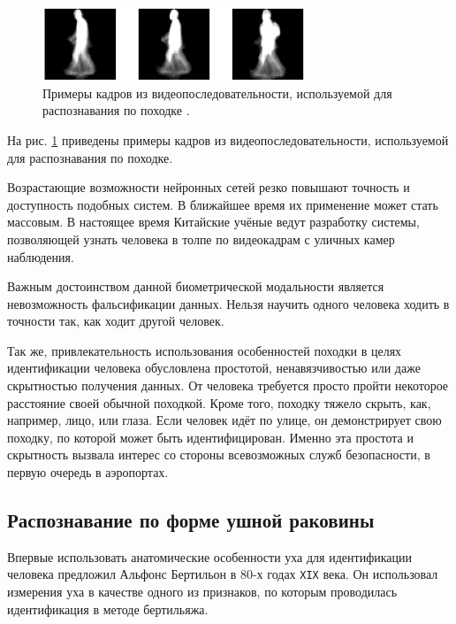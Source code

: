 \documentclass[14pt, a4paper]{extarticle}
\begin{document}
\begin{center}
	\begin{figure}[h!]
		\centering
		\includegraphics[width=0.7\textwidth]{gate.PNG}
		\caption{Примеры кадров из видеопоследовательности, используемой для распознавания по походке \cite{veres2005fusion}.}
		\label{img:gate}
	\end{figure}
\end{center}
\vspace{-1cm}

На рис. \ref{img:gate} приведены примеры кадров из видеопоследовательности, используемой для распознавания по походке. 

Возрастающие возможности нейронных сетей резко повышают точность и доступность подобных систем. В ближайшее время их применение может стать массовым.
В настоящее время Китайские учёные ведут разработку системы, позволяющей узнать человека в толпе по видеокадрам с уличных камер наблюдения. 

Важным достоинством данной биометрической модальности является невозможность фальсификации данных. Нельзя научить одного человека ходить в точности так, как ходит другой человек.

Так же, привлекательность использования особенностей походки в целях идентификации человека обусловлена простотой, ненавязчивостью или даже скрытностью получения данных. От человека требуется просто пройти некоторое расстояние своей обычной походкой. Кроме того, походку тяжело скрыть, как, например, лицо, или глаза. Если человек идёт по улице, он демонстрирует свою походку, по которой может быть идентифицирован. Именно эта простота и скрытность вызвала интерес со стороны всевозможных служб безопасности, в первую очередь в аэропортах.
\subsection{Распознавание по форме ушной раковины}
Впервые использовать анатомические особенности уха для идентификации человека предложил Альфонс Бертильон в 80-х годах \texttt{XIX} века. Он использовал измерения уха в качестве одного из признаков, по которым проводилась идентификация в методе бертильяжа.

\end{document}
